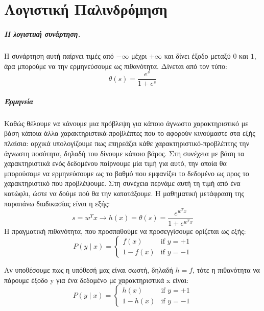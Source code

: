 \chapter{Λογιστική Παλινδρόμηση}
\label{appendix:LReg}
\paragraph{Η λογιστική συνάρτηση.} Η συνάρτηση αυτή παίρνει τιμές από $- \infty$ μέχρι $+ \infty$ και δίνει έξοδο μεταξύ $0$ και $1$, άρα μπορούμε να την ερμηνεύσουμε ως πιθανότητα. Δίνεται από τον τύπο:
\begin{equation}
\theta(s)=\frac{e^s}{1 + e^s}
\end{equation}


\paragraph{Ερμηνεία} Καθώς θέλουμε να κάνουμε μια πρόβλεψη για κάποιο άγνωστο χαρακτηριστικό με βάση κάποια άλλα χαρακτηριστικά-προβλέπτες που το αφορούν κινούμαστε στα εξής πλαίσια: αρχικά υπολογίζουμε πως επηρεάζει κάθε χαρακτηριστικό-προβλέπτης την άγνωστη ποσότητα, δηλαδή του δίνουμε κάποιο βάρος. Στη συνέχεια με βάση τα χαρακτηριστικά ενός δεδομένου παίρνουμε μία τιμή
για αυτό, την οποία θα μπορούσαμε να ερμηνεύσουμε ως το βαθμό που εμφανίζει το δεδομένο ως προς το χαρακτηριστικό που προβλέψουμε. Στη συνέχεια περνάμε αυτή τη τιμή  από ένα κατώφλι, ώστε να δούμε πού θα την κατατάξουμε. Η μαθηματική μετάφραση της παραπάνω διαδικασίας είναι η εξής:
\begin{equation}
s=w^T x \rightarrow h(x)=\theta(s)=\frac{e^{w^T x}}{1 + e^{w^T x} }\end{equation}
Η πραγματική πιθανότητα, που προσπαθούμε να προσεγγίσουμε  ορίζεται ως εξής:
\begin{equation}
P(y \mid x)=\left\{
\begin{array}{ll}
f(x)  & \mbox{if } y = +1 \\
1 - f(x)  & \mbox{if } y = -1
\end{array}
\right.
\end{equation}

Αν υποθέσουμε πως η υπόθεσή μας είναι σωστή, δηλαδή $h=f$, τότε η πιθανότητα να πάρουμε έξοδο y για ένα δεδομένο με χαρακτηριστικά x είναι:
\begin{equation}
P(y \mid x)=\left\{
\begin{array}{ll}
h(x)  & \mbox{if } y = +1 \\
1 - h(x)  & \mbox{if } y = -1
\end{array}
\right.
\end{equation}

